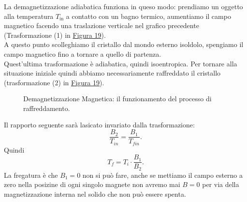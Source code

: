 La demagnetizzazione adiabatica funziona in queso modo: prendiamo un oggetto alla temperatura $T_{\text{in}}$ a contatto con un bagno termico,  aumentiamo il campo magnetico facendo una traslazione verticale nel grafico precedente (Trasformazione (1) in \hyperref[fig:demagnetizzazione-adiabatica-1]{Figura 19}).\\
A questo punto scolleghiamo il cristallo dal mondo esterno isoldolo, spengiamo il campo magnetico fino a tornare a quello di partenza. \\
Quest'ultima trasformazione è adiabatica, quindi isoentropica. Per tornare alla situazione iniziale quindi abbiamo necessariamente raffreddato il cristallo (trasformazione (2) in \hyperref[fig:demagnetizzazione-adiabatica-1]{Figura 19}).
\begin{figure}[H]
    \centering
    \caption{Demagnetizzazione Magnetica: il funzionamento del processo di raffreddamento.}
    \label{fig:demagnetizzazione-adiabatica-1}
\end{figure}
\noindent
Il rapporto seguente sarà lasicato invariato dalla trasformazione:
\[
	\frac{B_2}{T_{in}} = \frac{B_1}{T_{fin}}
.\] 
Quindi 
\[
	T_{f} = T_{i}\cdot \frac{B_1}{B_2}
.\] 
La fregatura è che $B_1=0$ non si può fare, anche se mettiamo il campo esterno a zero nella posizine di ogni singolo magnete non avremo mai $B = 0$ per via della magnetizzazione interna nel solido che non può essere spenta.\\
